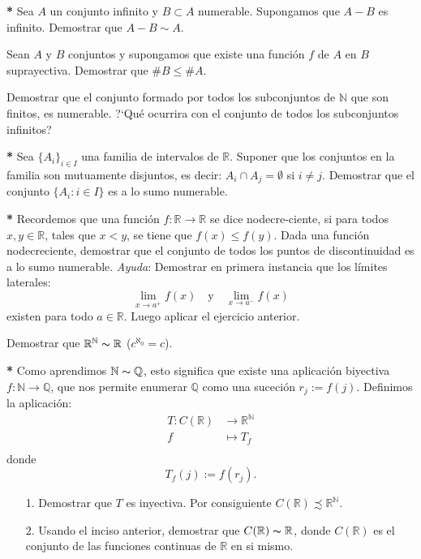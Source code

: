 \documentclass{book}
\newcommand{\rr}{\mathbb{R}}
\newcommand{\nn}{\mathbb{N}}
\begin{document}
\begin{ejer}{}\textbf{*} Sea $A$ un conjunto infinito y $B\subset A$ 
 numerable. Supongamos que $A-B$ es infinito. Demostrar que
$A-B\sim A$.
\end{ejer}




\begin{ejer}{} Sean $A$ y $B$ conjuntos y supongamos que existe
una función  $f$ de $A$ en $B$ suprayectiva. Demostrar que $\#
B\leq \#A$.
\end{ejer}

\begin{ejer}{} Demostrar que el conjunto formado por todos los
subconjuntos de $\nn$ que son finitos, es numerable.
?`Qué ocurrira con el conjunto de todos los subconjuntos
infinitos?
\end{ejer}

\begin{ejer}{}\textbf{*}  Sea $\{A_i\}_{i\in I}$ una familia de intervalos
de $\rr$. Suponer que los conjuntos en la familia son mutuamente
disjuntos, es decir: $A_i\cap A_j=\emptyset$ si $i\neq j$.
Demostrar que el conjunto $\{A_i:i\in I\}$ es a lo sumo numerable.
\end{ejer}

\begin{ejer}{}\textbf{*}  Recordemos que una función
$f:\rr\longrightarrow\rr$ se dice nodecre-\newline ciente, si para
todos $x,y\in\rr$, tales que $x<y$, se tiene que $f(x)\leq f(y)$.
Dada una función nodecreciente, demostrar que el conjunto de
todos los puntos de discontinuidad es a lo sumo numerable.
\textit{Ayuda}: Demostrar en primera instancia que los
límites laterales:
\[
    \lim\limits_{x\rightarrow a^+}f(x)\quad\text{y}\quad \lim\limits_{x\rightarrow
    a^-}f(x)
\]
existen para todo $a\in\rr$. Luego aplicar el ejercicio anterior.
\end{ejer}

\begin{ejer}{} Demostrar que $\rr^{\nn}\thicksim\rr$ ($c^{\aleph_0}=c$).
\end{ejer}

\begin{ejer}{}\textbf{*}  Como aprendimos $\nn\thicksim\mathbb{Q}$, esto
significa que existe una aplicación biyectiva
$f:\nn\longrightarrow\mathbb{Q}$, que nos permite enumerar
$\mathbb{Q}$ como una suceción $r_j:=f(j)$. Definimos la
aplicación:
\[\begin{split}
              T:C(\rr)&\longrightarrow \rr^{\nn}\\
              f        &\longmapsto T_f\\
\end{split}\]
donde
\[
  T_f(j):=f(r_j).
\]
\begin{itemize}
   \item [1.] Demostrar que $T$ es inyectiva. Por consiguiente
   $C(\rr)\precsim\rr^{\nn}$.
   \item[2.] Usando el inciso anterior, demostrar que
    $C(\rr)\thicksim\rr$, donde $C(\rr)$ es el conjunto
    de las funciones continuas de $\rr$ en si mismo.
\end{itemize}
\end{ejer}
\end{document}

